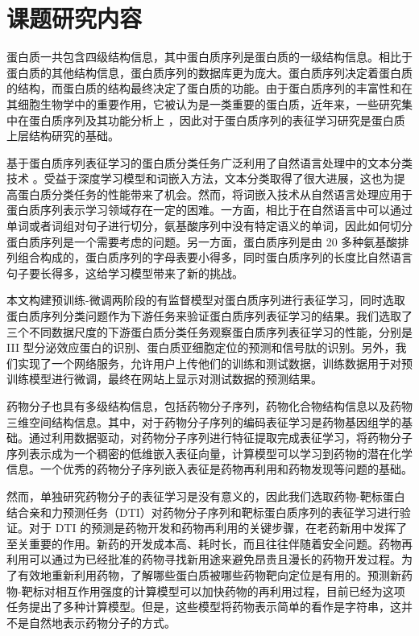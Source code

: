 \section{课题研究内容}
蛋白质一共包含四级结构信息，其中蛋白质序列是蛋白质的一级结构信息。相比于蛋白质的其他结构信息，蛋白质序列的数据库更为庞大。蛋白质序列决定着蛋白质的结构，而蛋白质的结构最终决定了蛋白质的功能。由于蛋白质序列的丰富性和在其细胞生物学中的重要作用，它被认为是一类重要的蛋白质，近年来，一些研究集中在蛋白质序列及其功能分析上 \cite{dyson2005intrinsically, sugase2007mechanism, he2009predicting}，因此对于蛋白质序列的表征学习研究是蛋白质上层结构研究的基础。

基于蛋白质序列表征学习的蛋白质分类任务广泛利用了自然语言处理中的文本分类技术 \cite{ganapathiraju2005computational}。受益于深度学习模型和词嵌入方法，文本分类取得了很大进展，这也为提高蛋白质分类任务的性能带来了机会。然而，将词嵌入技术从自然语言处理应用于蛋白质序列表示学习领域存在一定的困难。一方面，相比于在自然语言中可以通过单词或者词组对句子进行切分，氨基酸序列中没有特定语义的单词，因此如何切分蛋白质序列是一个需要考虑的问题。另一方面，蛋白质序列是由 20 多种氨基酸排列组合构成的，蛋白质序列的字母表要小得多，同时蛋白质序列的长度比自然语言句子要长得多，这给学习模型带来了新的挑战。

本文构建预训练-微调两阶段的有监督模型对蛋白质序列进行表征学习，同时选取蛋白质序列分类问题作为下游任务来验证蛋白质序列表征学习的结果。我们选取了三个不同数据尺度的下游蛋白质分类任务观察蛋白质序列表征学习的性能，分别是 III 型分泌效应蛋白的识别、蛋白质亚细胞定位的预测和信号肽的识别。另外，我们实现了一个网络服务，允许用户上传他们的训练和测试数据，训练数据用于对预训练模型进行微调，最终在网站上显示对测试数据的预测结果。

药物分子也具有多级结构信息，包括药物分子序列，药物化合物结构信息以及药物三维空间结构信息。其中，对于药物分子序列的编码表征学习是药物基因组学的基础。通过利用数据驱动，对药物分子序列进行特征提取完成表征学习，将药物分子序列表示成为一个稠密的低维嵌入表征向量，计算模型可以学习到药物的潜在化学信息。一个优秀的药物分子序列嵌入表征是药物再利用和药物发现等问题的基础。

然而，单独研究药物分子的表征学习是没有意义的，因此我们选取药物-靶标蛋白结合亲和力预测任务（DTI）对药物分子序列和靶标蛋白质序列的表征学习进行验证。对于 DTI 的预测是药物开发和药物再利用的关键步骤，在老药新用中发挥了至关重要的作用。新药的开发成本高、耗时长，而且往往伴随着安全问题。药物再利用可以通过为已经批准的药物寻找新用途来避免昂贵且漫长的药物开发过程。为了有效地重新利用药物，了解哪些蛋白质被哪些药物靶向定位是有用的。预测新药物-靶标对相互作用强度的计算模型可以加快药物的再利用过程，目前已经为这项任务提出了多种计算模型。但是，这些模型将药物表示简单的看作是字符串，这并不是自然地表示药物分子的方式。

